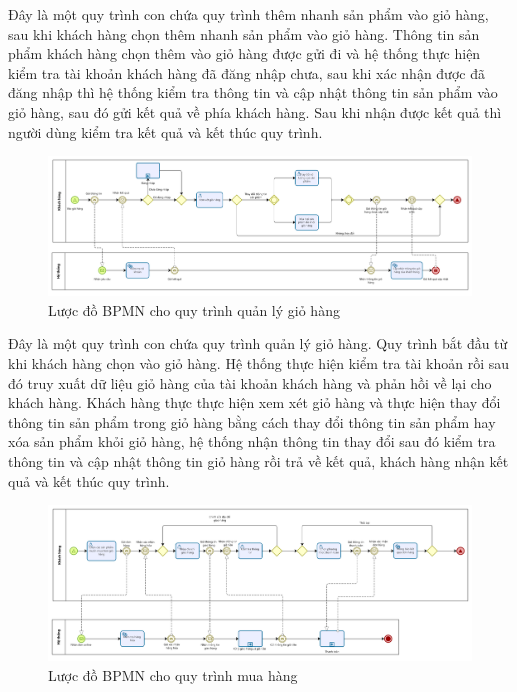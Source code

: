 Đây là một quy trình con chứa quy trình thêm nhanh sản phẩm vào giỏ hàng, sau khi khách hàng chọn thêm nhanh sản phẩm vào giỏ hàng. Thông tin sản phẩm khách hàng chọn thêm vào giỏ hàng được gửi đi và hệ thống thực hiện kiểm tra tài khoản khách hàng đã đăng nhập chưa, sau khi xác nhận được đã đăng nhập thì hệ thống kiểm tra thông tin và cập nhật thông tin sản phẩm vào giỏ hàng, sau đó gửi kết quả về phía khách hàng. Sau khi nhận được kết quả thì người dùng kiểm tra kết quả và kết thúc quy trình.
 
\begin{figure}[!htp]
    \centering
    \includegraphics[width=17cm]{img/BPMN/customer_buy/customer_cart.png}
    \newline
    \caption{Lược đồ BPMN cho quy trình quản lý giỏ hàng}
\end{figure}
 
Đây là một quy trình con chứa quy trình quản lý giỏ hàng. Quy trình bắt đầu từ khi khách hàng chọn vào giỏ hàng. Hệ thống thực hiện kiểm tra tài khoản rồi sau đó truy xuất dữ liệu giỏ hàng của tài khoản khách hàng và phản hồi về lại cho khách hàng. Khách hàng thực thực hiện xem xét giỏ hàng và thực hiện thay đổi thông tin sản phẩm trong giỏ hàng bằng cách thay đổi thông tin sản phẩm hay xóa sản phẩm khỏi giỏ hàng, hệ thống nhận thông tin thay đổi sau đó kiểm tra thông tin và cập nhật thông tin giỏ hàng rồi trả về kết quả, khách hàng nhận kết quả và kết thúc quy trình.
 
\newpage
 
\begin{figure}[!htp]
    \centering
    \includegraphics[width=17cm]{img/BPMN/customer_buy/customer_buy_order.png}
    \newline
    \caption{Lược đồ BPMN cho quy trình mua hàng}
\end{figure}
 
